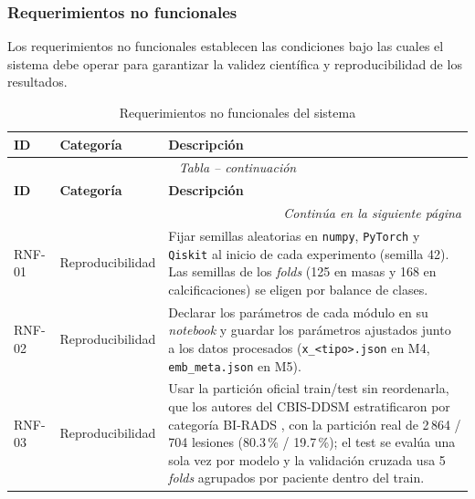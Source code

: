 \subsubsection{Requerimientos no funcionales}

Los requerimientos no funcionales establecen las condiciones
bajo las cuales el sistema debe operar para garantizar la
validez científica y reproducibilidad de los resultados.

\begingroup
\renewcommand{\arraystretch}{1.35}
\begin{longtable}{@{}llp{9.5cm}@{}}

\caption{Requerimientos no funcionales del sistema}
\label{tab:req_no_funcionales} \\

\toprule
\textbf{ID} & \textbf{Categoría} &
\textbf{Descripción} \\
\midrule
\endfirsthead

\multicolumn{3}{c}{%
  \small\textit{Tabla \thetable{} -- continuación}} \\[4pt]
\toprule
\textbf{ID} & \textbf{Categoría} &
\textbf{Descripción} \\
\midrule
\endhead

\midrule
\multicolumn{3}{r}{%
  \small\textit{Continúa en la siguiente página}} \\
\endfoot

\bottomrule
\endlastfoot

RNF-01 & Reproducibilidad &
Fijar semillas aleatorias en \texttt{numpy}, \texttt{PyTorch}
y \texttt{Qiskit} al inicio de cada experimento (semilla 42).
Las semillas de los \textit{folds} (125 en masas y 168 en
calcificaciones) se eligen por balance de clases. \\

RNF-02 & Reproducibilidad &
Declarar los parámetros de cada módulo en su \textit{notebook}
y guardar los parámetros ajustados junto a los datos procesados
(\texttt{x\_\textless tipo\textgreater.json} en M4, \texttt{emb\_meta.json} en M5). \\

RNF-03 & Reproducibilidad &
Usar la partición oficial train/test sin reordenarla, que los
autores del CBIS-DDSM estratificaron por categoría BI-RADS
\cite{Lee2017CBISDDSM}, con la partición real de 2\,864 / 704 lesiones (80.3\,\% / 19.7\,\%);
el test se evalúa una sola vez por modelo y la validación
cruzada usa 5 \textit{folds} agrupados por paciente dentro del
train. \\


\end{longtable}

